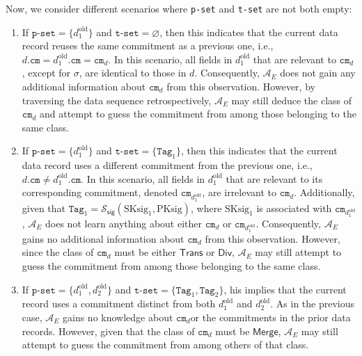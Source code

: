 Now, we consider different scenarios where \texttt{p-set} and \texttt{t-set} are not both empty:
\begin{enumerate}
	\item If \( \texttt{p-set} = \{d_1^{\text{old}}\} \) and \( \texttt{t-set} = \varnothing \), then this indicates that the current data record reuses the same commitment as a previous one, i.e., \( d.\texttt{cm} = d_1^{\text{old}}.\texttt{cm} = \texttt{cm}_d \). In this scenario, all fields in \( d_1^{\text{old}} \) that are relevant to \( \texttt{cm}_d \), except for \( \sigma \), are identical to those in \( d \). Consequently, \( \mathcal{A}_E \) does not gain any additional information about \( \texttt{cm}_d \) from this observation. However,  by traversing the data sequence retrospectively, \( \mathcal{A}_E \) may still deduce the class of \( \texttt{cm}_d \) and attempt to guess the commitment from among those belonging to the same class.
	
	\item If \( \texttt{p-set} = \{d_1^{\text{old}}\} \) and \( \texttt{t-set} = \{\texttt{Tag}_1\} \), then this indicates that the current data record uses a different commitment from the previous one, i.e., \( d.\texttt{cm} \neq d_1^{\text{old}}.\texttt{cm} \). In this scenario, all fields in \( d_1^{\text{old}} \) that are relevant to its corresponding commitment, denoted \( \texttt{cm}_{d_1^{\text{old}}} \), are irrelevant to \( \texttt{cm}_d \). Additionally, given that \( \texttt{Tag}_1 = \mathcal{S}_\mathsf{sig}(\text{SKsig}_1, \text{PKsig}) \), where \( \text{SKsig}_1 \) is associated with \( \texttt{cm}_{d_1^{\text{old}}} \), \( \mathcal{A}_E \) does not learn anything about either \( \texttt{cm}_d \) or \( \texttt{cm}_{d_1^{\text{old}}} \). Consequently, \( \mathcal{A}_E \) gains no additional information about \( \texttt{cm}_d \) from this observation. However, since the class of \( \texttt{cm}_d \) must be either \( \mathsf{Trans} \) or \( \mathsf{Div} \), \( \mathcal{A}_E \) may still attempt to guess the commitment from among those belonging to the same class.
	
	\item If \( \texttt{p-set} = \{d_1^{\text{old}}, d_2^{\text{old}}\} \) and \( \texttt{t-set} = \{\texttt{Tag}_1, \texttt{Tag}_2\} \), his implies that the current record uses a commitment distinct from both  \(d_1^{\text{old}}\) and \(d_2^{\text{old}}\). As in the previous case, \( \mathcal{A}_E \) gains no knowledge about  \( \texttt{cm}_d \)or the commitments in the prior data records. However, given that the class of  \( \texttt{cm}_d \) must be  \( \mathsf{Merge} \), \( \mathcal{A}_E \) may still attempt to guess the commitment from among others of that class.
	
\end{enumerate}

